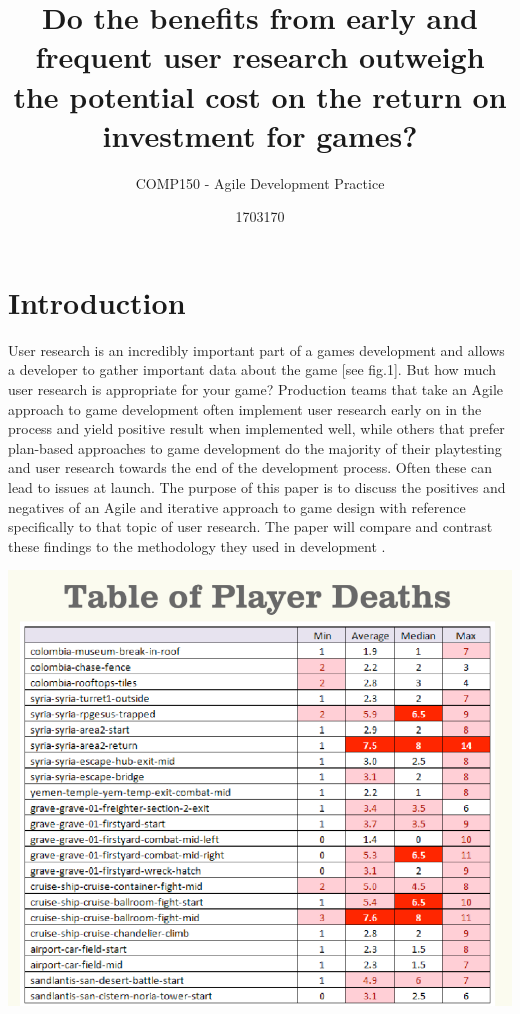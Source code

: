 \documentclass{scrartcl}
\title{Do the benefits from early and frequent user research outweigh the potential cost on the return on investment for games?
}
\subtitle{COMP150 - Agile Development Practice}
\author{1703170}
\begin{document}
\maketitle


\section{Introduction}

User research is an incredibly important part of a games development and allows a developer to gather important data about the game [see fig.1]. But how much user research is appropriate for your game? Production teams that take an Agile approach \cite{fowler2001agile:1} to game development often implement user research early on in the process and yield positive result when implemented well, while others that prefer plan-based approaches to game development do the majority of their playtesting and user research towards the end of the development process. Often these can lead to issues at launch. The purpose of this paper is to discuss the positives and negatives of an Agile and iterative approach to game design with reference specifically to that topic of user research. The paper will compare and contrast these findings to the methodology they used in development \cite{politowski2016old,}.

\begin{center}
\includegraphics[scale=0.4]{PlayerDeathTable.png}
\end{center}
\end{document}
